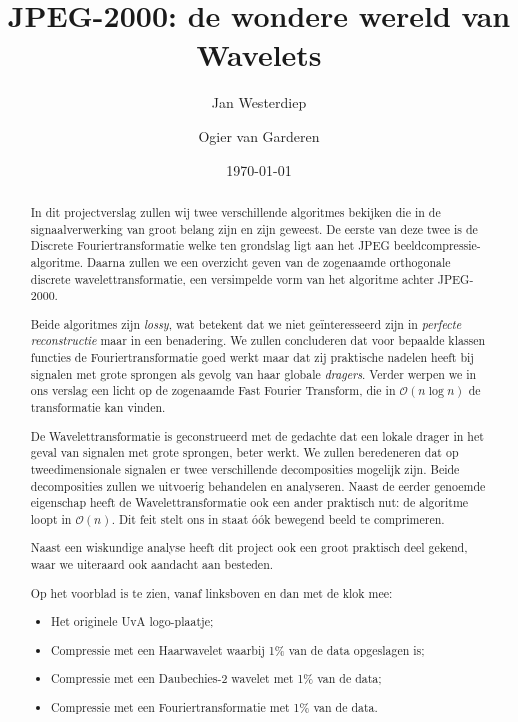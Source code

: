 \documentclass[11pt]{uvamath}
\title{JPEG-2000: de wondere wereld van Wavelets}
\date{\today}
\author[10219242, janner@gmail.com]{Jan Westerdiep}
\author[10191429, ovangarderen@gmail.com]{Ogier van Garderen}
\theoremstyle{plain}
\theoremstyle{definition}
\theoremstyle{remark}
\begin{document}
\maketitle

\begin{abstract}
In dit projectverslag zullen wij twee verschillende algoritmes bekijken die in de signaalverwerking van groot belang zijn en zijn geweest. De eerste van deze twee is de Discrete Fouriertransformatie welke ten grondslag ligt aan het JPEG beeldcompressie-algoritme. Daarna zullen we een overzicht geven van de zogenaamde orthogonale discrete wavelettransformatie, een versimpelde vorm van het algoritme achter JPEG-2000.

Beide algoritmes zijn \emph{lossy}, wat betekent dat we niet ge\"interesseerd zijn in \emph{perfecte reconstructie} maar in een benadering. We zullen concluderen dat voor bepaalde klassen functies de Fouriertransformatie goed werkt maar dat zij praktische nadelen heeft bij signalen met grote sprongen als gevolg van haar globale \emph{dragers}. Verder werpen we in ons verslag een licht op de zogenaamde Fast Fourier Transform, die in $\mathcal{O}(n \log n)$ de transformatie kan vinden.

De Wavelettransformatie is geconstrueerd met de gedachte dat een lokale drager in het geval van signalen met grote sprongen, beter werkt. We zullen beredeneren dat op tweedimensionale signalen er twee verschillende decomposities mogelijk zijn. Beide decomposities zullen we uitvoerig behandelen en analyseren. Naast de eerder genoemde eigenschap heeft de Wavelettransformatie ook een ander praktisch nut: de algoritme loopt in $\mathcal{O}(n)$. Dit  feit stelt ons in staat \'o\'ok bewegend beeld te comprimeren. 

Naast een wiskundige analyse heeft dit project ook een groot praktisch deel gekend, waar we uiteraard ook aandacht aan besteden.

Op het voorblad is te zien, vanaf linksboven en dan met de klok mee:
\begin{itemize}
	\item Het originele UvA logo-plaatje;
	\item Compressie met een Haarwavelet waarbij 1\% van de data opgeslagen is;
	\item Compressie met een Daubechies-2 wavelet met 1\% van de data;
	\item Compressie met een Fouriertransformatie met 1\% van de data.
\end{itemize}
\end{abstract}
\end{document}
